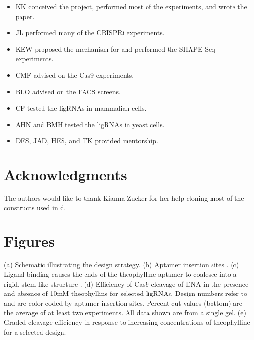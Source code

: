 \documentclass[10pt,oneside]{article}
\begin{document}
\begin{itemize}
    \item KK conceived the project, performed most of the experiments, and wrote the paper.
    \item JL performed many of the CRISPRi experiments.
    \item KEW proposed the mechanism for \ligrnaB{} and performed the SHAPE-Seq experiments.
    \item CMF advised on the \invitro{} Cas9 experiments.
    \item BLO advised on the FACS screens.
    \item CF tested the ligRNAs in mammalian cells.
    \item AHN and BMH tested the ligRNAs in yeast cells.
    \item DFS, JAD, HES, and TK provided mentorship.
\end{itemize}

\section{Acknowledgments}

The authors would like to thank Kianna Zucker for her help cloning most of the constructs used in d.

\section{Figures}



 (a) Schematic illustrating the design strategy.
%
%
 (b) Aptamer insertion sites \autocite{briner2014}.
%
%
 (c) Ligand binding causes the ends of the theophylline aptamer to coalesce into a rigid, stem-like structure \autocite{zimmerman1997}.
%
%
 (d) Efficiency of \invitro{} Cas9 cleavage of DNA in the presence and absence of 10mM theophylline for selected ligRNAs.  Design numbers refer to  and are color-coded by aptamer insertion sites.  Percent cut values (bottom) are the average of at least two experiments.  All data shown are from a single gel.
%
%
 (e) Graded cleavage efficiency in response to increasing concentrations of theophylline for a selected design.
\end{document}
